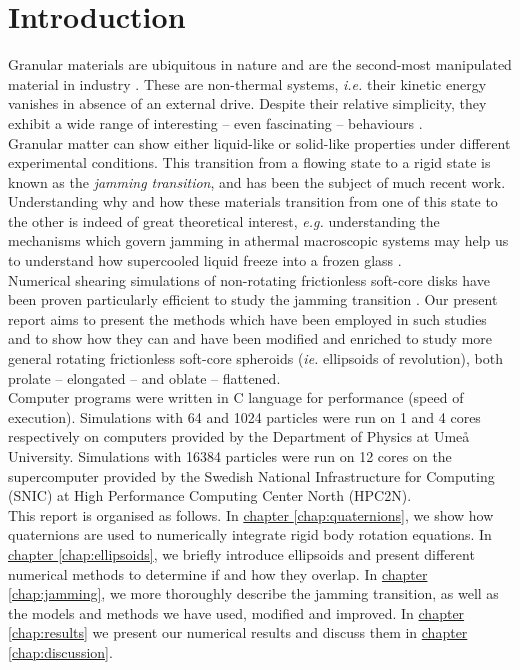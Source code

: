 \documentclass[class=report, float=false, crop=false]{standalone}
\begin{document}
\chapter*{Introduction}
\label{introduction}

Granular materials are ubiquitous in nature and are the second-most manipulated material in industry \cite{patrick2005slow}. These are non-thermal systems, \textit{i.e.} their kinetic energy vanishes in absence of an external drive. Despite their relative simplicity, they exhibit a wide range of interesting -- even fascinating -- behaviours \cite{youtube4}.\\

Granular matter can show either liquid-like or solid-like properties under different experimental conditions. This transition from a flowing state to a rigid state is known as the \textit{jamming transition}, and has been the subject of much recent work. Understanding why and how these materials transition from one of this state to the other is indeed of great theoretical interest, \textit{e.g.} understanding the mechanisms which govern jamming in athermal macroscopic systems may help us to understand how supercooled liquid freeze into a frozen glass \cite{liu1998nonlinear}.\\

Numerical shearing simulations of non-rotating frictionless soft-core disks have been proven particularly efficient to study the jamming transition \cite{PRL99.178001,PRE83.031307}. Our present report aims to present the methods which have been employed in such studies and to show how they can and have been modified and enriched to study more general rotating frictionless soft-core spheroids (\textit{ie.} ellipsoids of revolution), both prolate -- elongated -- and oblate -- flattened.\\

Computer programs were written in C language for performance (speed of execution). Simulations with 64 and 1024 particles were run on 1 and 4 cores respectively on computers provided by the Department of Physics at Umeå University. Simulations with 16384 particles were run on 12 cores on the supercomputer provided by the Swedish National Infrastructure for Computing (SNIC) at High Performance Computing Center North (HPC2N).\\

This report is organised as follows. In \hyperref[chap:quaternions]{chapter \ref{chap:quaternions}}, we show how quaternions are used to numerically integrate rigid body rotation equations. In \hyperref[chap:ellipsoids]{chapter \ref{chap:ellipsoids}}, we briefly introduce ellipsoids and present different numerical methods to determine if and how they overlap. In \hyperref[chap:jamming]{chapter \ref{chap:jamming}}, we more thoroughly describe the jamming transition, as well as the models and methods we have used, modified and improved. In \hyperref[chap:results]{chapter \ref{chap:results}} we present our numerical results and discuss them in \hyperref[chap:discussion]{chapter \ref{chap:discussion}}.\\
\end{document}
